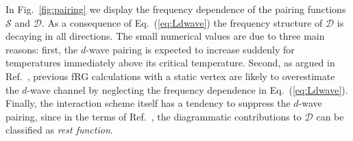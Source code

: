 In Fig.~\ref{fig:pairing} we display the frequency dependence of the pairing functions $\mathcal{S}$ and $\mathcal{D}$. 
As a consequence of Eq.~(\ref{eq:Ldwave}) the frequency structure of $\mathcal{D}$ is decaying in all directions.\cite{Wentzell2016a}
The small numerical values are due to three main reasons: 
first, the $d$-wave pairing is expected to increase suddenly for temperatures immediately above its critical temperature. 
Second, as argued in Ref.~, previous fRG calculations with a static vertex are likely to overestimate the $d$-wave channel by neglecting the frequency dependence in Eq.~(\ref{eq:Ldwave}). 
Finally, the interaction scheme itself has a tendency to suppress the $d$-wave pairing, since in the terms of Ref.~, the diagrammatic contributions to $\mathcal{D}$ can be classified as \emph{rest function}.
 

